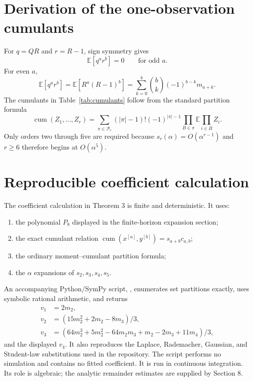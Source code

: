 \documentclass[11pt]{article}
\newcommand{\E}{\mathbb E}
\newcommand{\cum}{\operatorname{cum}}
\begin{document}
\appendix
\section{Derivation of the one-observation cumulants}
For $q=QR$ and $r=R-1$, sign symmetry gives
\begin{equation}
\E[q^a r^b]=0\qquad\text{for odd }a.
\end{equation}
For even $a$,
\begin{equation}
\E[q^a r^b]
=\E[R^a(R-1)^b]
=\sum_{k=0}^b\binom{b}{k}(-1)^{b-k}m_{a+k}.
\end{equation}
The cumulants in Table~\ref{tab:cumulants} follow from the standard partition formula
\begin{equation}
\cum(Z_1,\ldots,Z_r)
=\sum_{\pi\in\mathcal P_r}(|\pi|-1)!(-1)^{|\pi|-1}
\prod_{B\in\pi}\E\prod_{i\in B}Z_i.
\end{equation}
Only orders two through five are required because $s_r(\alpha)=O(\alpha^{r-1})$ and $r\ge6$ therefore begins at $O(\alpha^5)$.

\section{Reproducible coefficient calculation}
The coefficient calculation in Theorem 3 is finite and deterministic. It uses:
\begin{enumerate}
\item the polynomial $P_8$ displayed in the finite-horizon expansion section;
\item the exact cumulant relation $\cum(x^{[a]},y^{[b]})=s_{a+b}c_{a,b}$;
\item the ordinary moment--cumulant partition formula;
\item the $\alpha$ expansions of $s_2,s_3,s_4,s_5$.
\end{enumerate}
An accompanying Python/SymPy script,
, enumerates set partitions exactly,
uses symbolic rational arithmetic, and returns
\begin{align*}
v_1&=2m_2,\\
v_2&=(15m_2^2+2m_2-8m_3)/3,\\
v_3&=(64m_2^3+5m_2^2-64m_2m_3+m_2-2m_3+11m_4)/3,
\end{align*}
and the displayed $v_4$. It also reproduces the Laplace, Rademacher, Gaussian,
and Student-law substitutions used in the repository. The script performs no
simulation and contains no fitted coefficient.  It is run in continuous
integration.  Its role is algebraic; the analytic remainder estimates are
supplied by Section 8.
\end{document}

